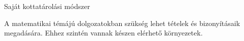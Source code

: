 \begin{large}
	Saját kottatárolási módszer
\end{large}

A matematikai témájú dolgozatokban szükség lehet tételek és bizonyításaik megadására.
Ehhez szintén vannak készen elérhető környezetek.

